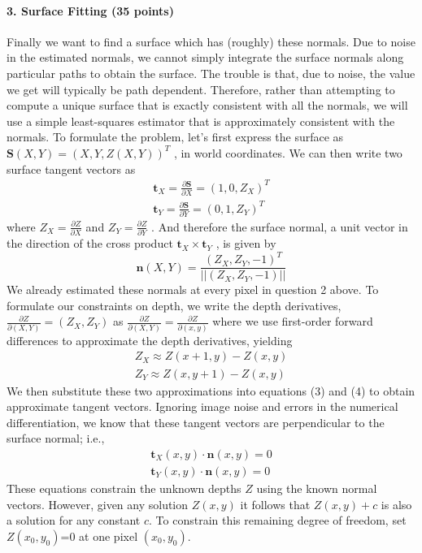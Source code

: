 \documentclass{paper}
\begin{document}
\paragraph{3. Surface Fitting (35 points)}Finally we want to find a surface which has (roughly) these normals. Due to noise in the estimated normals, we cannot simply integrate the surface normals along particular paths to obtain the surface. The trouble is that, due to noise, the value we get will typically be path dependent. Therefore, rather than attempting to compute a unique surface that is exactly consistent with all the normals, we will use a simple least-squares estimator that is approximately consistent with the normals.
To formulate the problem, let's first express the surface as $\textbf{S}(X,Y) =(X,Y,Z(X, Y ))^T$ , in world coordinates. We can then write two surface tangent vectors as
\begin{align}
\textbf{t}_{X}=\frac{\partial \textbf{S} }{\partial X }=(1,0,Z_X)^T\\
\textbf{t}_{Y}=\frac{\partial \textbf{S} }{\partial Y }=(0,1,Z_Y)^T
\end{align}
where $Z_X = \frac{\partial Z}{\partial X}$ and $Z_Y =\frac{\partial Z}{\partial Y}$ . And therefore the surface normal, a unit vector in the direction of the cross product $\textbf{t}_X \times \textbf{t}_Y$ , is given by
\begin{equation}
\textbf{n}(X,Y)=\frac{(Z_X,Z_Y,-1)^T}{||(Z_X,Z_Y,-1)||}
\end{equation}
We already estimated these normals at every pixel in question 2 above.
To formulate our constraints on depth, we write the depth derivatives, $\frac{\partial Z}{\partial (X,Y)}=(Z_X,Z_Y)$ as
$\frac{\partial Z}{\partial (X,Y)}=\frac{\partial Z}{\partial (x,y)}$
where we use first-order forward differences to approximate the depth derivatives, yielding
\begin{align}
Z_X\approx Z(x+1,y)-Z(x,y)\\
Z_Y\approx Z(x,y+1)-Z(x,y)
\end{align}
We then substitute these two approximations into equations (3) and (4) to obtain approximate tangent vectors. Ignoring image noise and errors in the numerical differentiation, we know that these tangent vectors are perpendicular to the surface normal; i.e.,
\begin{align}
\textbf{t}_X(x,y) \cdot \textbf{n}(x,y)=0\\
\textbf{t}_Y(x,y) \cdot \textbf{n}(x,y)=0
\end{align}
These equations constrain the unknown depths $Z$ using the known normal vectors. However, given any solution $Z(x,y)$ it follows that $Z(x,y)+c$ is also a solution for any constant $c$. To constrain this remaining degree of freedom, set $Z(x_0, y_0)$=0 at one pixel $(x_0, y_0)$.
\end{document}
